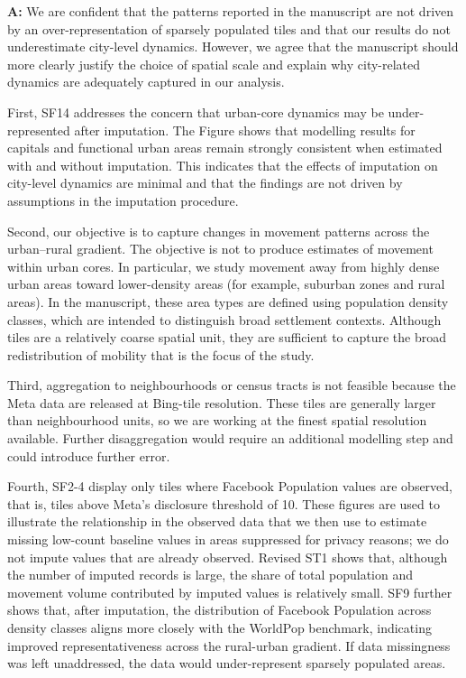 \documentclass[12pt,a4paper,oneside, reqno]{amsart}
\begin{document}
\setlength{\leftskip}{1cm}\textbf{A:} We are confident that the patterns reported in the manuscript are not driven by an over-representation of sparsely populated tiles and that our results do not underestimate city-level dynamics. However, we agree that the manuscript should more clearly justify the choice of spatial scale and explain why city-related dynamics are adequately captured in our analysis.

First, SF14 addresses the concern that urban-core dynamics may be under-represented after imputation. The Figure shows that modelling results for capitals and functional urban areas remain strongly consistent when estimated with and without imputation. This indicates that the effects of imputation on city-level dynamics are minimal and that the findings are not driven by assumptions in the imputation procedure.

Second, our objective is to capture changes in movement patterns across the urban–rural gradient. The objective is not to produce estimates of movement within urban cores. In particular, we study movement away from highly dense urban areas toward lower-density areas (for example, suburban zones and rural areas). In the manuscript, these area types are defined using population density classes, which are intended to distinguish broad settlement contexts. Although tiles are a relatively coarse spatial unit, they are sufficient to capture the broad redistribution of mobility that is the focus of the study. 

Third, aggregation to neighbourhoods or census tracts is not feasible because the Meta data are released at Bing-tile resolution. These tiles are generally larger than neighbourhood units, so we are working at the finest spatial resolution available. Further disaggregation would require an additional modelling step and could introduce further error.

Fourth, SF2-4 display only tiles where Facebook Population values are observed, that is, tiles above Meta’s disclosure threshold of 10. These figures are used to illustrate the relationship in the observed data that we then use to estimate missing low-count baseline values in areas suppressed for privacy reasons; we do not impute values that are already observed. Revised ST1 shows that, although the number of imputed records is large, the share of total population and movement volume contributed by imputed values is relatively small. SF9 further shows that, after imputation, the distribution of Facebook Population across density classes aligns more closely with the WorldPop benchmark, indicating improved representativeness across the rural-urban gradient. If data missingness was left unaddressed, the data would under-represent sparsely populated areas.
\end{document}
